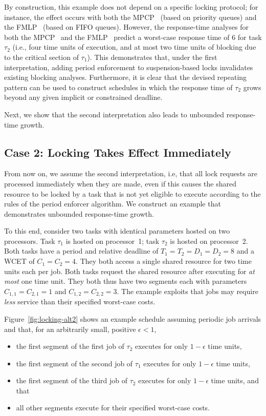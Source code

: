 By construction, this example does not depend on a specific locking protocol; for instance, the effect occurs with both the MPCP~\cite{Ra:90} (based on priority queues) and the FMLP~\cite{BLBA:07,BA:08} (based on FIFO queues). However,  the response-time analyses for both the MPCP~\cite{Br:13,LNR:09} and the   FMLP~\cite{Br:13} predict a worst-case response time of $6$ for task $\tau_2$ (i.e., four time units of execution, and at most two time units of blocking due to the critical section of $\tau_1$). This demonstrates that, under the first interpretation, adding period enforcement to suspension-based locks invalidates existing blocking analyses. Furthermore, it is clear that the devised repeating pattern can be used to construct schedules in which the response time of $\tau_2$  grows beyond any given implicit or constrained deadline.

Next, we show that the second interpretation also leads to unbounded response-time growth.


\subsection{Case 2: Locking Takes Effect Immediately}
From now on, we assume the second interpretation, i.e, that all lock requests are processed immediately when they are made, even if this causes the shared resource to be locked by a task that is not yet eligible to execute according to  the rules of the period enforcer algorithm. We construct an example that demonstrates unbounded response-time growth.

To this end, consider two tasks with identical parameters hosted on two processors. Task $\tau_1$ is hosted on processor~1; task $\tau_2$ is hosted on processor~2. Both tasks have a period and relative deadline of $T_1 = T_2 = D_1 = D_2 = 8$ and a WCET of $C_1 = C_2 = 4$. They both access a single shared resource for two time units each per job. Both tasks request the shared resource after executing for \emph{at most} one time unit. They both thus have two segments each with parameters $C_{1,1} = C_{2,1} = 1$ and $C_{1,2} = C_{2,2} = 3$. The example exploits that jobs may require \emph{less} service than their specified worst-case costs.

Figure~\ref{fig:locking-alt2} shows an example schedule assuming periodic job arrivals and that, for an arbitrarily small, positive $\epsilon <1$,
\begin{itemize}
	\item the first segment of the first job of $\tau_2$ executes for only $1-\epsilon$ time units,
	\item the first segment of the second job of $\tau_1$ executes for only $1-\epsilon$ time units,
	\item the first segment of the third job  of $\tau_2$ executes for only $1-\epsilon$ time units, and that
	\item all other segments execute for their specified worst-case costs.
\end{itemize}


